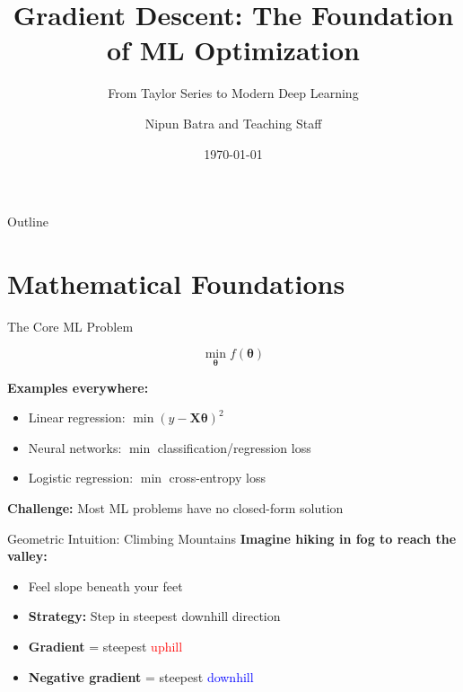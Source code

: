 \documentclass[aspectratio=169,11pt]{beamer}
\title{Gradient Descent: The Foundation of ML Optimization}
\subtitle{From Taylor Series to Modern Deep Learning}
\author{Nipun Batra and Teaching Staff}
\institute{IIT Gandhinagar}
\date{\today}
\newcommand{\grad}{\nabla}
\newcommand{\vtheta}{\bm{\theta}}
\newcommand{\mX}{\bm{X}}
\begin{document}
\maketitle

\begin{frame}{Outline}
\tableofcontents
\end{frame}

\section{Mathematical Foundations}

\begin{frame}{The Core ML Problem}
\begin{center}
\Large
\[\min_{\vtheta} f(\vtheta)\]
\end{center}

\pause
\textbf{Examples everywhere:}
\begin{itemize}
\item Linear regression: $\min (y - \mX\vtheta)^2$
\item Neural networks: $\min$ classification/regression loss
\item Logistic regression: $\min$ cross-entropy loss
\end{itemize}

\pause
\textbf{Challenge:} Most ML problems have no closed-form solution
\end{frame}

\begin{frame}{Geometric Intuition: Climbing Mountains}
\textbf{Imagine hiking in fog to reach the valley:}

\begin{itemize}
\item Feel slope beneath your feet
\item \textbf{Strategy:} Step in steepest downhill direction
\item \textbf{Gradient} = steepest \textcolor{red}{uphill}
\item \textbf{Negative gradient} = steepest \textcolor{blue}{downhill}
\end{itemize}

\pause
\begin{center}
\end{center}
\end{frame}
\end{document}
